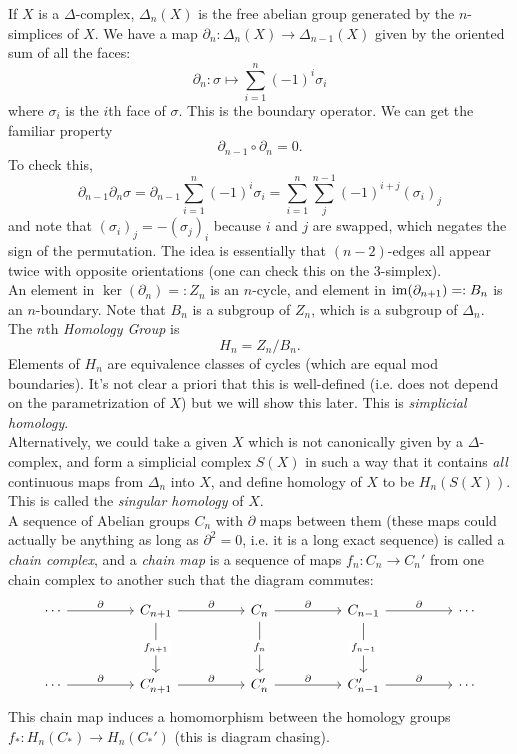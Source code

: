 \documentclass{amsart}
\begin{document}
	 If $X$ is a $\Delta$-complex, $\Delta_n(X)$ is the free abelian group generated by the $n$-simplices of $X$. We have a map $\partial_n:\Delta_n(X)\to \Delta_{n-1}(X)$ given by the oriented sum of all the faces:
	 $$
	 \partial_n : \sigma \mapsto \sum_{i=1}^n (-1)^i \sigma_i
	 $$
	 where $\sigma_i$ is the $i$th face of $\sigma$. This is the boundary operator. We can get the familiar property 
	 $$
	 \partial_{n-1} \circ \partial_n = 0.
	 $$
	 To check this,
	 $$
	 \partial_{n-1}\partial_n \sigma = \partial_{n-1}\sum_{i=1}^n (-1)^i \sigma_i = \sum_{i=1}^n\sum_j^{n-1} (-1)^{i+j} (\sigma_i)_j
	 $$
	 and note that $(\sigma_i)_j = - (\sigma_j)_i$ because $i$ and $j$ are swapped, which negates the sign of the permutation. The idea is essentially that $(n-2)$-edges all appear twice with opposite orientations (one can check this on the $3$-simplex).\\
	 
	 An element in $\ker(\partial_n)=:Z_n$ is an $n$-cycle, and element in $\operatorname{im}(\partial_{n+1})=:B_n$ is an $n$-boundary. Note that $B_n$ is a subgroup of $Z_n$, which is a subgroup of $\Delta_n$. The $n$th \textit{Homology Group} is 
	 $$H_n = Z_n/B_n.$$
	 Elements of $H_n$ are equivalence classes of cycles (which are equal mod boundaries). It's not clear a priori that this is well-defined (i.e. does not depend on the parametrization of $X$) but we will show this later. This is \textit{simplicial homology}.\\
	 
	 Alternatively, we could take a given $X$ which is not canonically given by a $\Delta$-complex, and form a simplicial complex $S(X)$ in such a way that it contains \textit{all} continuous maps from $\Delta_n$ into $X$, and define homology of $X$ to be $H_n(S(X))$. This is called the \textit{singular homology} of $X$.\\
	 
	 A sequence of Abelian groups $C_n$ with $\partial$ maps between them (these maps could actually be anything as  long as $\partial^2=0$, i.e. it is a long exact sequence) is called a \textit{chain complex}, and a \textit{chain map} is a sequence of maps $f_n:C_n\to C_n'$ from one chain complex to another such that the diagram commutes:
	 $$
	 \begin{tikzcd}
	 	\cdots && {C_{n+1}} && {C_n} && {C_{n-1}} && \cdots \\
	 	\\
	 	\cdots && {C_{n+1}'} && {C_n'} && {C_{n-1}'} && \cdots
	 	\arrow["\partial", from=1-1, to=1-3]
	 	\arrow["\partial", from=1-3, to=1-5]
	 	\arrow["{f_{n+1}}"{description}, from=1-3, to=3-3]
	 	\arrow["\partial", from=1-5, to=1-7]
	 	\arrow["{f_{n}}"{description}, from=1-5, to=3-5]
	 	\arrow["\partial", from=1-7, to=1-9]
	 	\arrow["{f_{n-1}}"{description}, from=1-7, to=3-7]
	 	\arrow["\partial", from=3-1, to=3-3]
	 	\arrow["\partial", from=3-3, to=3-5]
	 	\arrow["\partial", from=3-5, to=3-7]
	 	\arrow["\partial", from=3-7, to=3-9]
	 \end{tikzcd}
	 $$
	 This chain map induces a homomorphism between the homology groups $f_*:H_n(C_*)\to H_n(C_{*}')$ (this is diagram chasing).\\
	 
\end{document}
